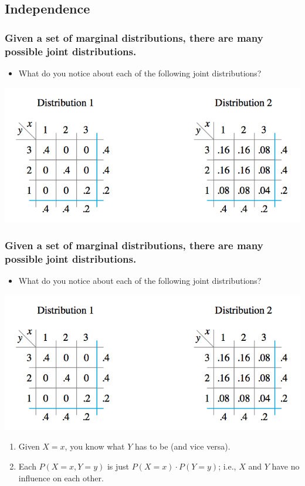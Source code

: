 \documentclass[handout]{beamer}\usepackage{graphicx, color}
\numberwithin{equation}{section}
\begin{document}
\subsection{Independence}

\begin{frame}
\frametitle{\small Given a set of marginal distributions, there are many possible joint distributions.}
\begin{itemize}
\item What do you notice about each of the following joint distributions?
\end{itemize}
 \includegraphics{../../fig/2joint.png}
\end{frame}

\begin{frame}
\frametitle{\small Given a set of marginal distributions, there are many possible joint distributions.} \small
\begin{itemize}
\item What do you notice about each of the following joint distributions?
\end{itemize}
 \includegraphics{../../fig/2joint.png}
\begin{enumerate}[1. ]
\pause \item Given $X = x$, you know what $Y$ has to be (and vice versa). 
\pause \item Each $P(X = x, Y = y)$ is just $P(X = x) \cdot P(Y = y)$; i.e., $X$ and $Y$ have no influence on each other.
\end{enumerate}
\end{frame}
\end{document}
